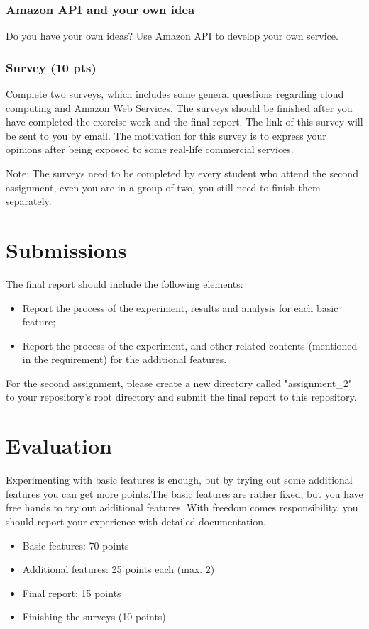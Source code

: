 \documentclass[12pt, a4paper]{article}
\begin{document}
\subsubsection{Amazon API and your own idea}
Do you have your own ideas? Use Amazon API to develop your own service.
\subsubsection{Survey (10 pts)}
Complete two surveys, which includes some general questions regarding cloud computing and Amazon Web Services. The surveys should be finished after you have completed the exercise work and the final report. The link of this survey will be sent to you by email. The motivation for this survey is to express your opinions after being exposed to some real-life commercial services.

Note: The surveys need to be completed by every student who attend the second assignment, even you are in a group of two, you still need to finish them separately.
\section{Submissions}
The final report should include the following elements:
\begin{itemize}
\item Report the process of the experiment, results and analysis for each basic feature;
\item Report the process of the experiment, and other related contents (mentioned in the requirement) for the additional features.
\end{itemize}
For the second assignment, please create a new directory called "assignment\_2" to your repository's root directory and submit the final report to this repository.
\section{Evaluation}
Experimenting with basic features is enough, but by trying out some additional features you can get more points.The basic features are rather fixed, but you have free hands to try out additional features. With freedom comes responsibility, you should report your experience with detailed documentation.
\begin{itemize}
\item Basic features: 70 points
\item Additional features: 25 points each (max. 2)
\item Final report: 15 points
\item Finishing the surveys (10 points)
\end{itemize}
\end{document}

